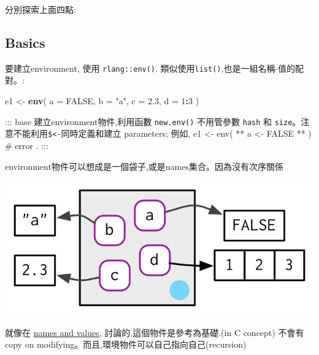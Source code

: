 \documentclass[]{book}
\newenvironment{Shaded}{\begin{snugshade}}{\end{snugshade}}
\newcommand{\KeywordTok}[1]{\textcolor[rgb]{0.13,0.29,0.53}{\textbf{#1}}}
\newcommand{\DataTypeTok}[1]{\textcolor[rgb]{0.13,0.29,0.53}{#1}}
\newcommand{\DecValTok}[1]{\textcolor[rgb]{0.00,0.00,0.81}{#1}}
\newcommand{\FloatTok}[1]{\textcolor[rgb]{0.00,0.00,0.81}{#1}}
\newcommand{\StringTok}[1]{\textcolor[rgb]{0.31,0.60,0.02}{#1}}
\newcommand{\OtherTok}[1]{\textcolor[rgb]{0.56,0.35,0.01}{#1}}
\newcommand{\OperatorTok}[1]{\textcolor[rgb]{0.81,0.36,0.00}{\textbf{#1}}}
\newcommand{\NormalTok}[1]{#1}
\theoremstyle{definition}
\theoremstyle{definition}
\theoremstyle{definition}
\theoremstyle{remark}
\begin{document}
分別探索上面四點:

\subsection{Basics}\label{basics}

要建立environment, 使用 \texttt{rlang::env()}.
類似使用\texttt{list()},也是一組名稱-值的配對。:

\begin{Shaded}
\begin{Highlighting}[]
\NormalTok{e1 <-}\StringTok{ }\KeywordTok{env}\NormalTok{(}
  \DataTypeTok{a =} \OtherTok{FALSE}\NormalTok{,}
  \DataTypeTok{b =} \StringTok{"a"}\NormalTok{,}
  \DataTypeTok{c =} \FloatTok{2.3}\NormalTok{,}
  \DataTypeTok{d =} \DecValTok{1}\OperatorTok{:}\DecValTok{3}
\NormalTok{)}
\end{Highlighting}
\end{Shaded}

::: base 建立environment物件,利用函數 \texttt{new.env()} 不用管參數
\texttt{hash} 和
\texttt{size}。注意不能利用\texttt{\$\textless{}-}同時定義和建立
parameters; 例如, e1 \textless{}- env( ** a \textless{}- FALSE ** ) \#
error . :::

environment物件可以想成是一個袋子,或是names集合。因為沒有次序關係

\begin{center}\includegraphics{diagrams/environments/bindings} \end{center}

就像在 \protect\hyperlink{env-modify}{names and values},
討論的,這個物件是參考為基礎.(in C concept) 不會有copy on
modifying。而且,環境物件可以自己指向自己(recursion)

\begin{Shaded}
\end{Shaded}
\end{document}
